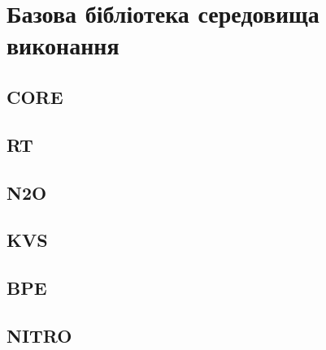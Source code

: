 \chapter{Базова бібліотека середовища виконання}

\section{CORE}

\section{RT}

\section{N2O}

\section{KVS}

\section{BPE}

\section{NITRO}




